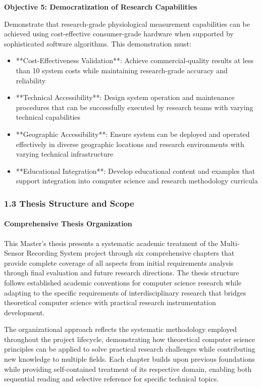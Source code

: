 \documentclass[12pt,a4paper]{report}
\begin{document}
\textbf{Objective 5: Democratization of Research Capabilities}

Demonstrate that research-grade physiological measurement capabilities can be achieved using cost-effective
consumer-grade hardware when supported by sophisticated software algorithms. This demonstration must:

\begin{itemize}
\item **Cost-Effectiveness Validation**: Achieve commercial-quality results at less than 10%
  system costs while maintaining research-grade accuracy and reliability
\item **Technical Accessibility**: Design system operation and maintenance procedures that can be successfully executed by
  research teams with varying technical capabilities
\item **Geographic Accessibility**: Ensure system can be deployed and operated effectively in diverse geographic locations
  and research environments with varying technical infrastructure
\item **Educational Integration**: Develop educational content and examples that support integration into computer science
  and research methodology curricula

\end{itemize}
\subsubsection{1.3 Thesis Structure and Scope}

\paragraph{Comprehensive Thesis Organization}

This Master's thesis presents a systematic academic treatment of the Multi-Sensor Recording System project through six
comprehensive chapters that provide complete coverage of all aspects from initial requirements analysis through final
evaluation and future research directions. The thesis structure follows established academic conventions for computer
science research while adapting to the specific requirements of interdisciplinary research that bridges theoretical
computer science with practical research instrumentation development.

The organizational approach reflects the systematic methodology employed throughout the project lifecycle, demonstrating
how theoretical computer science principles can be applied to solve practical research challenges while contributing new
knowledge to multiple fields. Each chapter builds upon previous foundations while providing self-contained treatment of
its respective domain, enabling both sequential reading and selective reference for specific technical topics.
\end{document}
